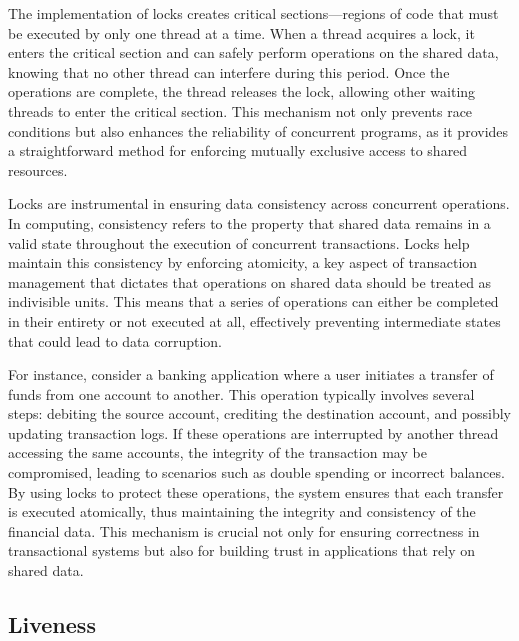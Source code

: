 The implementation of locks creates critical sections—regions of code that must be executed by only one thread at a time. When a thread acquires a lock, it enters the critical section and can safely perform operations on the shared data, knowing that no other thread can interfere during this period. Once the operations are complete, the thread releases the lock, allowing other waiting threads to enter the critical section. This mechanism not only prevents race conditions but also enhances the reliability of concurrent programs, as it provides a straightforward method for enforcing mutually exclusive access to shared resources.


Locks are instrumental in ensuring data consistency across concurrent operations. In computing, consistency refers to the property that shared data remains in a valid state throughout the execution of concurrent transactions. Locks help maintain this consistency by enforcing atomicity, a key aspect of transaction management that dictates that operations on shared data should be treated as indivisible units. This means that a series of operations can either be completed in their entirety or not executed at all, effectively preventing intermediate states that could lead to data corruption.

For instance, consider a banking application where a user initiates a transfer of funds from one account to another. This operation typically involves several steps: debiting the source account, crediting the destination account, and possibly updating transaction logs. If these operations are interrupted by another thread accessing the same accounts, the integrity of the transaction may be compromised, leading to scenarios such as double spending or incorrect balances. By using locks to protect these operations, the system ensures that each transfer is executed atomically, thus maintaining the integrity and consistency of the financial data. This mechanism is crucial not only for ensuring correctness in transactional systems but also for building trust in applications that rely on shared data.


\subsection{Liveness}

